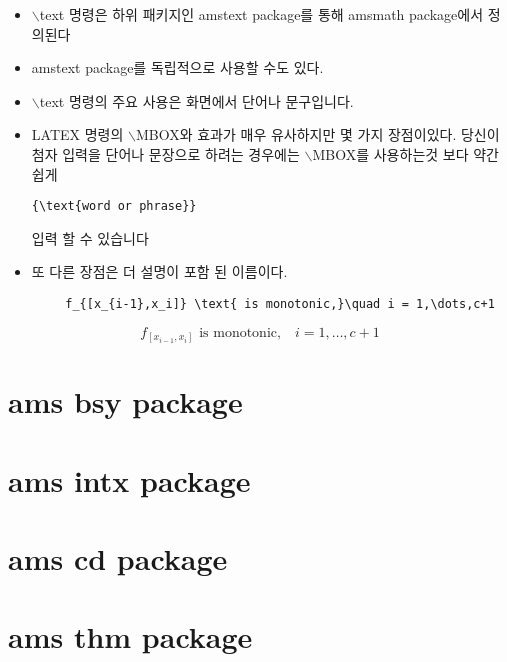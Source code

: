 \documentclass[12pt,a4paper]{report}
\begin{document}
	\begin{itemize}[itemsep=0.0em]
	\item	$\backslash$text 명령은 하위 패키지인  amstext package를 통해 amsmath package에서 정의된다
	\item	amstext package를 독립적으로 사용할 수도 있다.
	\item	$\backslash$text 명령의 주요 사용은 화면에서 단어나 문구입니다.
	\item	LATEX 명령의 $\backslash$MBOX와  효과가 매우 유사하지만 몇 가지 장점이있다.
			당신이 첨자 입력을 단어나 문장으로 하려는 경우에는 $\backslash$MBOX를 사용하는것 보다 
			약간 쉽게 \begin{verbatim}{\text{word or phrase}} \end{verbatim} 입력 할 수 있습니다 

	\item 또 다른 장점은 더 설명이 포함 된 이름이다.	
	\end{itemize}
	
	\begin{framed}
	\begin{verbatim}
		f_{[x_{i-1},x_i]} \text{ is monotonic,}\quad i = 1,\dots,c+1
	\end{verbatim}
	\end{framed}
	
	\begin{equation}
		f_{[x_{i-1},x_i]} \text{ is monotonic,}\quad i = 1,\dots,c+1
	\end{equation}	
	
		
		
		
\newpage
\section{ams bsy package}


\newpage
\section{ams intx package}


\newpage
\section{ams cd package}



\newpage
\section{ams thm package}
\end{document}
